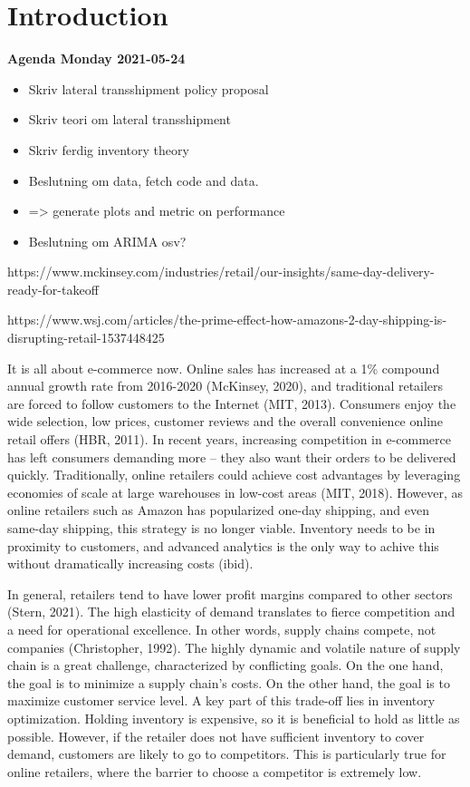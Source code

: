 \documentclass[../../main.tex]{subfiles}
\begin{document}

\chapter{Introduction}

\textbf{Agenda Monday 2021-05-24}
\begin{itemize}
\item  Skriv lateral transshipment policy proposal
\item  Skriv teori om lateral transshipment
\item  Skriv ferdig inventory theory 
\item  Beslutning om data, fetch code and data.
\item  => generate plots and metric on performance
\item  Beslutning om ARIMA osv?
\end{itemize}


https://www.mckinsey.com/industries/retail/our-insights/same-day-delivery-ready-for-takeoff

https://www.wsj.com/articles/the-prime-effect-how-amazons-2-day-shipping-is-disrupting-retail-1537448425

It is all about e-commerce now. Online sales has increased at a 1\% compound annual growth rate from 2016-2020 (McKinsey, 2020), and traditional retailers are forced to follow customers to the Internet (MIT, 2013). Consumers enjoy the wide selection, low prices, customer reviews and the overall convenience online retail offers (HBR, 2011). In recent years, increasing competition in e-commerce has left consumers demanding more – they also want their orders to be delivered quickly. Traditionally, online retailers could achieve cost advantages by leveraging economies of scale at large warehouses in low-cost areas (MIT, 2018). However, as online retailers such as Amazon has popularized one-day shipping, and even same-day shipping, this strategy is no longer viable. Inventory needs to be in proximity to  customers, and advanced analytics is the only way to achive this without dramatically increasing costs (ibid).

In general, retailers tend to have lower profit margins compared to other sectors (Stern, 2021). The high elasticity of demand translates to fierce competition and a need for operational excellence. In other words, supply chains compete, not companies (Christopher, 1992). The highly dynamic and volatile nature of supply chain is a great challenge, characterized by conflicting goals. On the one hand, the goal is to minimize a supply chain's costs. On the other hand, the goal is to maximize customer service level. A key part of this trade-off lies in inventory optimization. Holding inventory is expensive, so it is beneficial to hold as little as possible. However, if the retailer does not have sufficient inventory to cover demand, customers are likely to go to competitors. This is particularly true for online retailers, where the barrier to choose a competitor is extremely low. 
\end{document}
